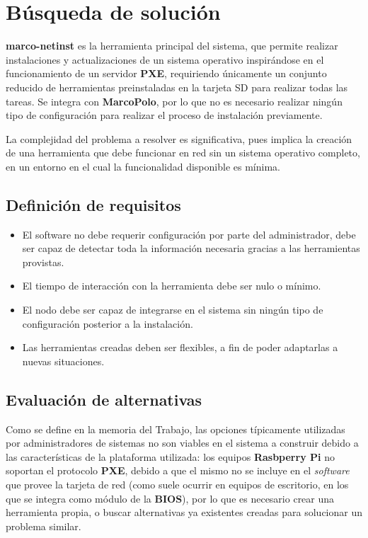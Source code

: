 \documentclass{article}
\begin{document}
\section{Búsqueda de solución}

\textbf{marco-netinst} es la herramienta principal del sistema, que permite realizar instalaciones y actualizaciones de un sistema operativo inspirándose en el funcionamiento de un servidor \textbf{PXE}, requiriendo únicamente un conjunto reducido de herramientas preinstaladas en la tarjeta SD para realizar todas las tareas. Se integra con \textbf{MarcoPolo}, por lo que no es necesario realizar ningún tipo de configuración para realizar el proceso de instalación previamente.

La complejidad del problema a resolver es significativa, pues implica la creación de una herramienta que debe funcionar en red sin un sistema operativo completo, en un entorno en el cual la funcionalidad disponible es mínima.

\subsection{Definición de requisitos}

\begin{itemize}
\item El software no debe requerir configuración por parte del administrador, debe ser capaz de detectar toda la información necesaria gracias a las herramientas provistas.
\item El tiempo de interacción con la herramienta debe ser nulo o mínimo.
\item El nodo debe ser capaz de integrarse en el sistema sin ningún tipo de configuración posterior a la instalación.
\item Las herramientas creadas deben ser flexibles, a fin de poder adaptarlas a nuevas situaciones.
\end{itemize}

\subsection{Evaluación de alternativas}

Como se define en la memoria del Trabajo, las opciones típicamente utilizadas por administradores de sistemas no son viables en el sistema a construir debido a las características de la plataforma utilizada: los equipos \textbf{Rasbperry Pi} no soportan el protocolo \textbf{PXE}, debido a que el mismo no se incluye en el \textit{software} que provee la tarjeta de red (como suele ocurrir en equipos de escritorio, en los que se integra como módulo de la \textbf{BIOS}), por lo que es necesario crear una herramienta propia, o buscar alternativas ya existentes creadas para solucionar un problema similar.
\end{document}

